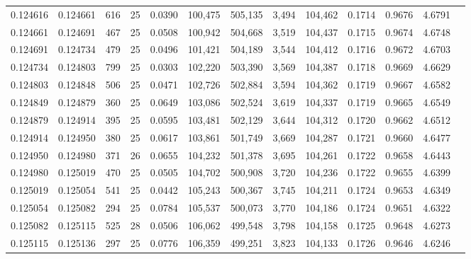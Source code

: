 \begin{tabular}{rrrrrrrrrrrrr}
0.124616 & 0.124661 &   616 &  25 &                                     0.0390 & 100,475 & 505,135 &   3,494 & 104,462 & 0.1714 & 0.9676 & 4.6791 \\
0.124661 & 0.124691 &   467 &  25 &                                     0.0508 & 100,942 & 504,668 &   3,519 & 104,437 & 0.1715 & 0.9674 & 4.6748 \\
0.124691 & 0.124734 &   479 &  25 &                                     0.0496 & 101,421 & 504,189 &   3,544 & 104,412 & 0.1716 & 0.9672 & 4.6703 \\
0.124734 & 0.124803 &   799 &  25 &                                     0.0303 & 102,220 & 503,390 &   3,569 & 104,387 & 0.1718 & 0.9669 & 4.6629 \\
0.124803 & 0.124848 &   506 &  25 &                                     0.0471 & 102,726 & 502,884 &   3,594 & 104,362 & 0.1719 & 0.9667 & 4.6582 \\
0.124849 & 0.124879 &   360 &  25 &                                     0.0649 & 103,086 & 502,524 &   3,619 & 104,337 & 0.1719 & 0.9665 & 4.6549 \\
0.124879 & 0.124914 &   395 &  25 &                                     0.0595 & 103,481 & 502,129 &   3,644 & 104,312 & 0.1720 & 0.9662 & 4.6512 \\
0.124914 & 0.124950 &   380 &  25 &                                     0.0617 & 103,861 & 501,749 &   3,669 & 104,287 & 0.1721 & 0.9660 & 4.6477 \\
0.124950 & 0.124980 &   371 &  26 &                                     0.0655 & 104,232 & 501,378 &   3,695 & 104,261 & 0.1722 & 0.9658 & 4.6443 \\
0.124980 & 0.125019 &   470 &  25 &                                     0.0505 & 104,702 & 500,908 &   3,720 & 104,236 & 0.1722 & 0.9655 & 4.6399 \\
0.125019 & 0.125054 &   541 &  25 &                                     0.0442 & 105,243 & 500,367 &   3,745 & 104,211 & 0.1724 & 0.9653 & 4.6349 \\
0.125054 & 0.125082 &   294 &  25 &                                     0.0784 & 105,537 & 500,073 &   3,770 & 104,186 & 0.1724 & 0.9651 & 4.6322 \\
0.125082 & 0.125115 &   525 &  28 &                                     0.0506 & 106,062 & 499,548 &   3,798 & 104,158 & 0.1725 & 0.9648 & 4.6273 \\
0.125115 & 0.125136 &   297 &  25 &                                     0.0776 & 106,359 & 499,251 &   3,823 & 104,133 & 0.1726 & 0.9646 & 4.6246 \\

\end{tabular}
